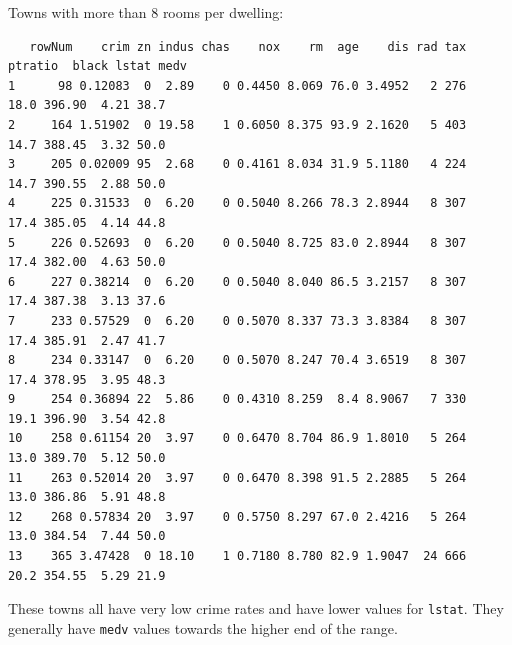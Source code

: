 \documentclass[11pt]{article}
\begin{document}
Towns with more than 8 rooms per dwelling:
\begin{verbatim}
   rowNum    crim zn indus chas    nox    rm  age    dis rad tax ptratio  black lstat medv
1      98 0.12083  0  2.89    0 0.4450 8.069 76.0 3.4952   2 276    18.0 396.90  4.21 38.7
2     164 1.51902  0 19.58    1 0.6050 8.375 93.9 2.1620   5 403    14.7 388.45  3.32 50.0
3     205 0.02009 95  2.68    0 0.4161 8.034 31.9 5.1180   4 224    14.7 390.55  2.88 50.0
4     225 0.31533  0  6.20    0 0.5040 8.266 78.3 2.8944   8 307    17.4 385.05  4.14 44.8
5     226 0.52693  0  6.20    0 0.5040 8.725 83.0 2.8944   8 307    17.4 382.00  4.63 50.0
6     227 0.38214  0  6.20    0 0.5040 8.040 86.5 3.2157   8 307    17.4 387.38  3.13 37.6
7     233 0.57529  0  6.20    0 0.5070 8.337 73.3 3.8384   8 307    17.4 385.91  2.47 41.7
8     234 0.33147  0  6.20    0 0.5070 8.247 70.4 3.6519   8 307    17.4 378.95  3.95 48.3
9     254 0.36894 22  5.86    0 0.4310 8.259  8.4 8.9067   7 330    19.1 396.90  3.54 42.8
10    258 0.61154 20  3.97    0 0.6470 8.704 86.9 1.8010   5 264    13.0 389.70  5.12 50.0
11    263 0.52014 20  3.97    0 0.6470 8.398 91.5 2.2885   5 264    13.0 386.86  5.91 48.8
12    268 0.57834 20  3.97    0 0.5750 8.297 67.0 2.4216   5 264    13.0 384.54  7.44 50.0
13    365 3.47428  0 18.10    1 0.7180 8.780 82.9 1.9047  24 666    20.2 354.55  5.29 21.9
\end{verbatim}

These towns all have very low crime rates and have lower values for \texttt{lstat}. They generally have \texttt{medv} values towards the higher end of the range.
\end{document}

